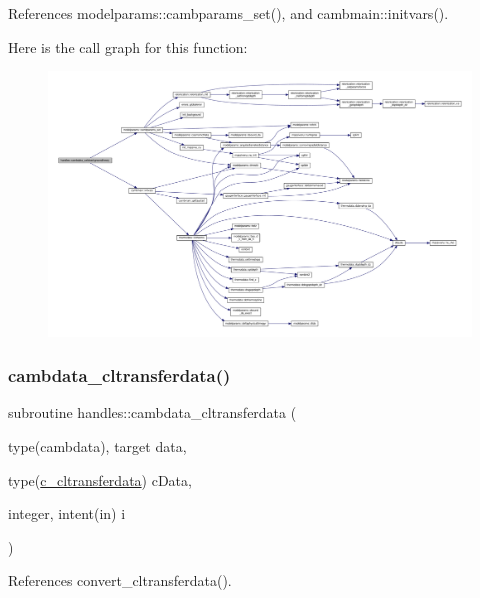 References modelparams\+::cambparams\+\_\+set(), and cambmain\+::initvars().

Here is the call graph for this function\+:
\nopagebreak
\begin{figure}[H]
\begin{center}
\leavevmode
\includegraphics[width=350pt]{namespacehandles_a2c10aa9ff66a25677588584f3fc4f2a3_cgraph}
\end{center}
\end{figure}
\mbox{\label{namespacehandles_ab0bb10def620b06fb617f4704d9342d9}} 
\subsubsection{\texorpdfstring{cambdata\+\_\+cltransferdata()}{cambdata\_cltransferdata()}}
{\footnotesize\ttfamily subroutine handles\+::cambdata\+\_\+cltransferdata (\begin{DoxyParamCaption}\item[{type(cambdata), target}]{data,  }\item[{type(\mbox{\hyperlink{structhandles_1_1c__cltransferdata}{c\+\_\+cltransferdata}})}]{c\+Data,  }\item[{integer, intent(in)}]{i }\end{DoxyParamCaption})}



References convert\+\_\+cltransferdata().

